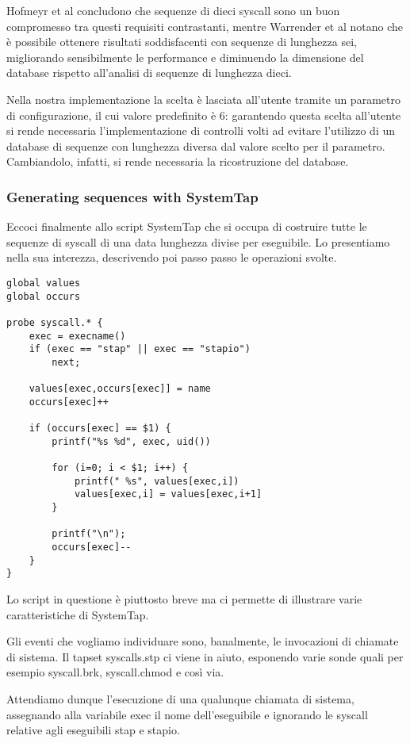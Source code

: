 \documentclass[11pt]{article}
\begin{document}
Hofmeyr et al \cite{hofmeyr97} concludono che sequenze di dieci syscall sono un
buon compromesso tra questi requisiti contrastanti, mentre Warrender et al
\cite{warrender99} notano che è possibile ottenere risultati soddisfacenti con
sequenze di lunghezza sei, migliorando sensibilmente le performance e
diminuendo la dimensione del database rispetto all'analisi di sequenze di
lunghezza dieci.

Nella nostra implementazione la scelta è lasciata all'utente tramite un
parametro di configurazione, il cui valore predefinito è 6: garantendo questa
scelta all'utente si rende necessaria l'implementazione di controlli volti ad
evitare l'utilizzo di un database di sequenze con lunghezza diversa dal valore
scelto per il parametro. Cambiandolo, infatti, si rende necessaria la
ricostruzione del database.

\subsubsection{Generating sequences with SystemTap}
\label{ids:systemtap}
Eccoci finalmente allo script SystemTap che si occupa di costruire tutte le
sequenze di syscall di una data lunghezza divise per eseguibile. Lo presentiamo
nella sua interezza, descrivendo poi passo passo le operazioni svolte.

\begin{lstlisting}
global values
global occurs

probe syscall.* {
    exec = execname()
    if (exec == "stap" || exec == "stapio")
        next;

    values[exec,occurs[exec]] = name
    occurs[exec]++

    if (occurs[exec] == $1) {
        printf("%s %d", exec, uid())

        for (i=0; i < $1; i++) {
            printf(" %s", values[exec,i])
            values[exec,i] = values[exec,i+1]
        }

        printf("\n");
        occurs[exec]--
    }
}
\end{lstlisting}

Lo script in questione è piuttosto breve ma ci permette di illustrare varie
caratteristiche di SystemTap. 

Gli eventi che vogliamo individuare sono, banalmente, le invocazioni di
chiamate di sistema. Il tapset syscalls.stp ci viene in aiuto, esponendo varie
sonde quali per esempio syscall.brk, syscall.chmod e così via.

Attendiamo dunque l'esecuzione di una qualunque chiamata di sistema, assegnando
alla variabile exec il nome dell'eseguibile e ignorando le syscall relative
agli eseguibili stap e stapio.
\end{document}
